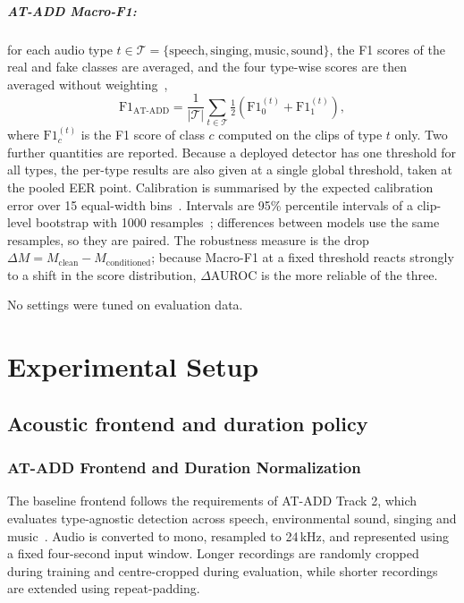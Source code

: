 \documentclass[12pt,a4paper]{report}
\begin{document}
\paragraph{AT-ADD Macro-F1:} for each audio type $t \in \mathcal{T} = \{\text{speech}, \text{singing}, \text{music}, \text{sound}\}$, the F1 scores of the real and fake classes are averaged, and the four type-wise scores are then averaged without weighting~\cite{xie2026atadd},
\begin{equation}
\mathrm{F1}_{\mathrm{AT\text{-}ADD}} = \frac{1}{|\mathcal{T}|}\sum_{t \in \mathcal{T}} \tfrac{1}{2}\left(\mathrm{F1}_{0}^{(t)} + \mathrm{F1}_{1}^{(t)}\right),
\label{eq:atadd}
\end{equation}
where $\mathrm{F1}_{c}^{(t)}$ is the F1 score of class $c$ computed on the clips of type $t$ only. Two further quantities are reported. Because a deployed detector has one threshold for all types, the per-type results are also given at a single global threshold, taken at the pooled EER point. Calibration is summarised by the expected calibration error over 15 equal-width bins~\cite{guo2017calibration}. Intervals are 95\% percentile intervals of a clip-level bootstrap with 1000 resamples~\cite{efron1993bootstrap}; differences between models use the same resamples, so they are paired. The robustness measure is the drop $\Delta M = M_{\mathrm{clean}}-M_{\mathrm{conditioned}}$; because Macro-F1 at a fixed threshold reacts strongly to a shift in the score distribution, $\Delta$AUROC is the more reliable of the three.

No settings were tuned on evaluation data.

\chapter{Experimental Setup}
\label{ch:setup}

\section{Acoustic frontend and duration policy}
\label{sec:setup-frontend}

\subsection{AT-ADD Frontend and Duration Normalization}
\label{sec:duration-norm}

The baseline frontend follows the requirements of AT-ADD Track 2, which evaluates type-agnostic detection across speech, environmental sound, singing and music~\cite{xie2026atadd}. Audio is converted to mono, resampled to 24\,kHz, and represented using a fixed four-second input window. Longer recordings are randomly cropped during training and centre-cropped during evaluation, while shorter recordings are extended using repeat-padding.
\end{document}
